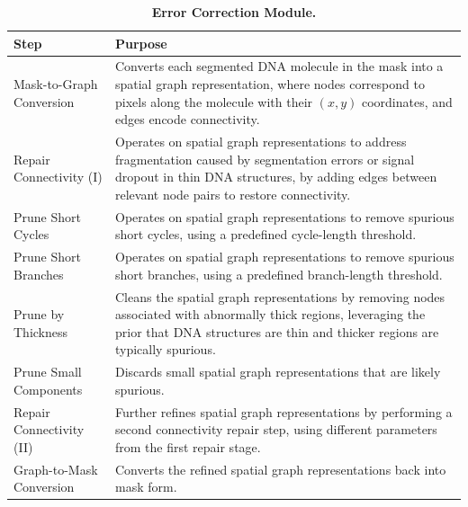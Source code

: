 \begin{table}[H]
\centering
\caption{\textbf{Error Correction Module.}}
\begin{tabular}{|l|p{8cm}|}
\hline
\textbf{Step} & \textbf{Purpose} \\
\hline
Mask-to-Graph Conversion & Converts each segmented DNA molecule in the mask into a spatial graph representation, where nodes correspond to pixels along the molecule with their $(x, y)$ coordinates, and edges encode connectivity. \\
\hline
Repair Connectivity (I) & Operates on spatial graph representations to address fragmentation caused by segmentation errors or signal dropout in thin DNA structures, by adding edges between relevant node pairs to restore connectivity. \\
\hline
Prune Short Cycles & Operates on spatial graph representations to remove spurious short cycles, using a predefined cycle-length threshold. \\
\hline
Prune Short Branches & Operates on spatial graph representations to remove spurious short branches, using a predefined branch-length threshold. \\
\hline
Prune by Thickness & Cleans the spatial graph representations by removing nodes associated with abnormally thick regions, leveraging the prior that DNA structures are thin and thicker regions are typically spurious. \\
\hline
Prune Small Components & Discards small spatial graph representations that are likely spurious. \\
\hline
Repair Connectivity (II) & Further refines spatial graph representations by performing a second connectivity repair step, using different parameters from the first repair stage. \\
\hline
Graph-to-Mask Conversion & Converts the refined spatial graph representations back into mask form. \\
\hline
\end{tabular}
\label{tab:correction_pipeline}
\end{table}